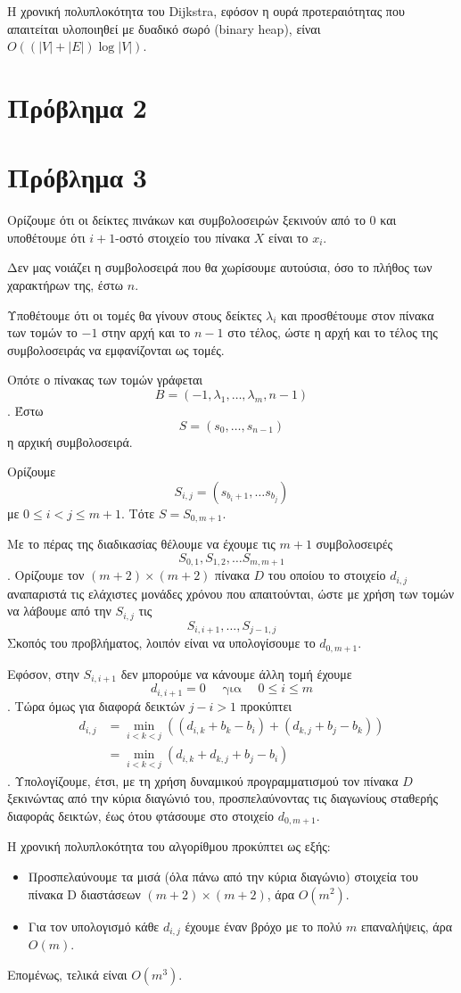 \documentclass[12pt]{article}
\begin{document}
Η χρονική πολυπλοκότητα του Dijkstra, εφόσον η ουρά προτεραιότητας που απαιτείται υλοποιηθεί με δυαδικό σωρό (binary heap), είναι \(O((|V| + |E|)\log |V|)\). \hfill \blacksquare 

\newpage
\section*{Πρόβλημα 2 }

\newpage
\section*{Πρόβλημα 3} 
Ορίζουμε ότι οι δείκτες πινάκων και συμβολοσειρών ξεκινούν από το \(0\) και υποθέτουμε ότι \(i+1\)-οστό στοιχείο του πίνακα \(X\) είναι το \(x_i\).
\bigskip

Δεν μας νοιάζει η συμβολοσειρά που θα χωρίσουμε αυτούσια, όσο το πλήθος των χαρακτήρων της, έστω \(n\). 

Υποθέτουμε ότι οι τομές θα γίνουν στους δείκτες \(\lambda_i\) και προσθέτουμε στον πίνακα των τομών το \(-1\) στην αρχή και το \(n-1\) στο τέλος, ώστε η αρχή και το τέλος της συμβολοσειράς να εμφανίζονται ως τομές. 

Οπότε ο πίνακας των τομών γράφεται 
\[
    B = (-1, \lambda_1, \ldots, \lambda_m, n-1)
\].
Έστω \[S = (s_0, \ldots, s_{n-1})\] η αρχική συμβολοσειρά. 

Ορίζουμε 
\[
    S_{i,j} = (s_{b_i+1},\ldots s_{b_j})
\] με \(0 \leq i < j \leq m+1\).
Tότε \(S = S_{0, m+1}\).

Με το πέρας της διαδικασίας θέλουμε να έχουμε τις \(m+1\) συμβολοσειρές 
\[
    S_{0,1}, S_{1,2}, \ldots S_{m, m+1}
\].
Ορίζουμε τον \((m+2) \times (m+2)\) πίνακα \(D\) του οποίου το στοιχείο \(d_{i,j}\) αναπαριστά τις ελάχιστες μονάδες χρόνου που απαιτούνται, ώστε με χρήση των τομών να λάβουμε από την \(S_{i, j}\) τις 
\[
    S_{i,i+1},\ldots, S_{j-1, j}\]
Σκοπός του προβλήματος, λοιπόν είναι να υπολογίσουμε το \(d_{0, m+1}\). 

Εφόσον, στην \(S_{i,i+1}\) δεν μπορούμε να κάνουμε άλλη τομή έχουμε 
\[
    d_{i,i+1} = 0 \quad \text{  για  }\quad 0 \leq i \leq m\].
Τώρα όμως για διαφορά δεικτών \(j - i > 1\) προκύπτει
\begin{align*}
    d_{i,j} &= \min_{i < k < j} \left( (d_{i,k} + b_k - b_i) + (d_{k,j} + b_j - b_k) \right) \\
            &= \min_{i < k < j} \left( d_{i,k}+ d_{k,j} + b_j - b_i \right)
\end{align*}
. Υπολογίζουμε, έτσι, με τη χρήση δυναμικού προγραμματισμού τον πίνακα \(D\) ξεκινώντας από την κύρια διαγώνιό του, προσπελαύνοντας τις διαγωνίους σταθερής διαφοράς δεικτών, έως ότου φτάσουμε στο στοιχείο \(d_{0, m+1}\). 

\bigskip
Η χρονική πολυπλοκότητα του αλγορίθμου προκύπτει ως εξής: 
\begin{itemize}
    \item Προσπελαύνουμε τα μισά (όλα πάνω από την κύρια διαγώνιο) στοιχεία του πίνακα D διαστάσεων \((m+2)\times (m+2)\), άρα \(O(m^2)\).
    \item Για τον υπολογισμό κάθε \(d_{i,j}\) έχουμε έναν βρόχο με το πολύ \(m\) επαναλήψεις, άρα \(O(m)\).
\end{itemize}
Επομένως, τελικά είναι \(O(m^3)\). \hfill \blacksquare
\end{document}

